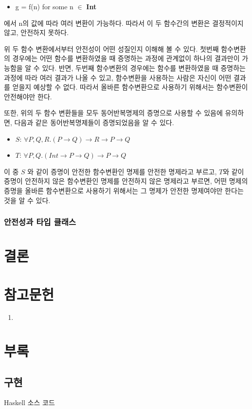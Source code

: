 \documentclass[a4paper, 12pt]{oblivoir}
\newcommand{\texttype}[1]{{\bfseries\ttfamily#1}}
\begin{document}
\begin{itemize}[noitemsep]
\item g = f(n) for some n $\in$ \texttype{Int}
\end{itemize}

에서 n의 값에 따라 여러 변환이 가능하다. 따라서 이 두 함수간의 변환은 결정적이지 않고,
안전하지 못하다.

위 두 함수 변환에서부터 안전성이 어떤 성질인지 이해해 볼 수 있다. 첫번째 함수변환의 경우에는 어떤 함수를 변환하였을 때 증명하는 과정에 관계없이 하나의 결과만이 가능함을 알 수 있다. 반면, 두번째 함수변환의 경우에는 함수를 변환하였을 때 증명하는 과정에 따라 여러 결과가 나올 수 있고, 함수변환을 사용하는 사람은 자신이 어떤 결과를 얻을지 예상할 수 없다. 따라서 올바른 함수변환으로 사용하기 위해서는 함수변환이 안전해야만 한다.

또한, 위의 두 함수 변환들을 모두 동어반복명제의 증명으로 사용할 수 있음에 유의하면,
다음과 같은 동어반복명제들이 증명되었음을 알 수 있다.

\begin{itemize}[noitemsep]
\item $S$: $\forall{}P, Q, R . (P \rightarrow{} Q) \rightarrow{} R \rightarrow{} P \rightarrow{} Q$
\item $T$: $\forall{}P, Q . (Int \rightarrow{} P \rightarrow{} Q) \rightarrow{} P \rightarrow{} Q$
\end{itemize}

이 중 $S$ 와 같이 증명이 안전한 함수변환인 명제를 안전한 명제라고 부르고,
$T$와 같이 증명이 안전하지 않은 함수변환인 명제를 안전하지 않은 명제라고 부르면, 어떤 명제의 증명을 올바른 함수변환으로 사용하기 위해서는 그 명제가 안전한 명제여야만 한다는 것을 알 수 있다.

\subsubsection{안전성과 타입 클래스}


\section{결론}

\section{참고문헌}
\begin{enumerate}[label=(\arabic*)]
\item 
\end{enumerate}

\newpage{}
\appendix
\section{부록}
\subsection{구현}
Haskell 소스 코드
\end{document}
